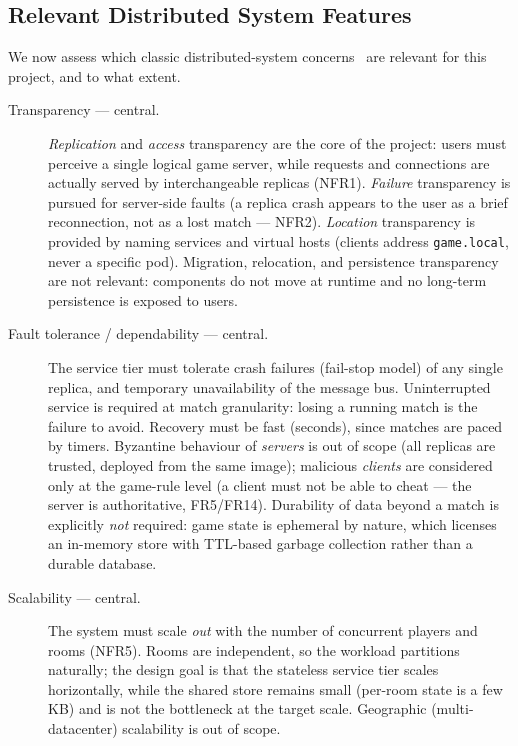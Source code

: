 \documentclass{scrartcl}
\begin{document}
\subsection{Relevant Distributed System Features}
\label{ds-features}

We now assess which classic distributed-system
concerns~\cite{tanenbaum2017distributed} are relevant for this project, and
to what extent.

\begin{description}
  \item[Transparency --- central.] \emph{Replication} and \emph{access}
  transparency are the core of the project: users must perceive a single
  logical game server, while requests and connections are actually served
  by interchangeable replicas (NFR1). \emph{Failure} transparency is
  pursued for server-side faults (a replica crash appears to the user as a
  brief reconnection, not as a lost match --- NFR2). \emph{Location}
  transparency is provided by naming services and virtual hosts (clients
  address \texttt{game.local}, never a specific pod). Migration,
  relocation, and persistence transparency are not relevant: components do
  not move at runtime and no long-term persistence is exposed to users.

  \item[Fault tolerance / dependability --- central.] The service tier must
  tolerate crash failures (fail-stop model) of any single replica, and
  temporary unavailability of the message bus. Uninterrupted service is
  required at match granularity: losing a running match is the failure to
  avoid. Recovery must be fast (seconds), since matches are paced by
  timers. Byzantine behaviour of \emph{servers} is out of scope (all
  replicas are trusted, deployed from the same image); malicious
  \emph{clients} are considered only at the game-rule level (a client must
  not be able to cheat --- the server is authoritative, FR5/FR14).
  Durability of data beyond a match is explicitly \emph{not} required:
  game state is ephemeral by nature, which licenses an in-memory store
  with TTL-based garbage collection rather than a durable database.

  \item[Scalability --- central.] The system must scale \emph{out} with the
  number of concurrent players and rooms (NFR5). Rooms are independent, so
  the workload partitions naturally; the design goal is that the stateless
  service tier scales horizontally, while the shared store remains small
  (per-room state is a few KB) and is not the bottleneck at the target
  scale. Geographic (multi-datacenter) scalability is out of scope.


\end{description}
\end{document}
